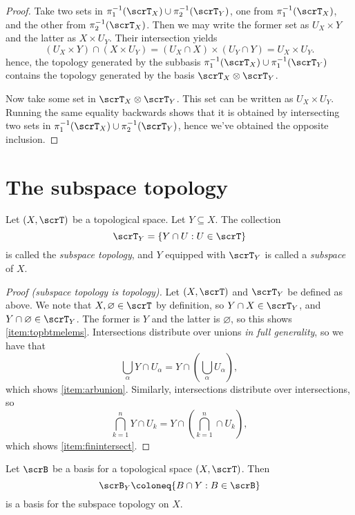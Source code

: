 \documentclass{article}
\begin{document}
\begin{proof}
    Take two sets in $\pi_1^{-1}(\scrT_X) \cup \pi_2^{-1}(\scrT_Y)$, one from $\pi_1^{-1}(\scrT_X)$, and the other from $\pi_2^{-1}(\scrT_X)$.
    Then we may write the former set as $U_X \times Y$ and the latter as $X \times U_Y$.
    Their intersection yields
    \[
        (U_X \times Y) \cap (X \times U_Y) = (U_X \cap X) \times (U_Y \cap Y) = U_X \times U_Y.
    \]
    hence, the topology generated by the subbasis $\pi_1^{-1}(\scrT_X) \cup \pi_1^{-1}(\scrT_Y)$ contains the topology generated by the basis $\scrT_X \otimes \scrT_Y$.

    Now take some set in $\scrT_X \otimes \scrT_Y$.
    This set can be written as $U_X \times U_Y$.
    Running the same equality backwards shows that it is obtained by intersecting two sets in $\pi_1^{-1}(\scrT_X) \cup \pi_2^{-1}(\scrT_Y)$, hence we've obtained the opposite inclusion.
\end{proof}

\section{The subspace topology}

\begin{definition}
    Let $(X, \scrT)$ be a topological space.
    Let $Y \subseteq X$.
    The collection
    \[
        \scrT_Y = \{Y \cap U : U \in \scrT\}
    \]
    is called the \textit{subspace topology}, and $Y$ equipped with $\scrT_Y$ is called a \textit{subspace} of $X$.
\end{definition}

\begin{proof}[Proof (subspace topology is topology)]
    Let $(X, \scrT)$ and $\scrT_Y$ be defined as above.
    We note that $X, \varnothing \in \scrT$ by definition, so
    $Y \cap X \in \scrT_Y$, and $Y \cap \varnothing \in \scrT_Y$.
    The former is $Y$ and the latter is $\varnothing$, so this shows \ref{item:topbtmelems}.
    Intersections distribute over unions \textit{in full generality}, so we have that
    \[
        \bigcup_\alpha Y \cap U_\alpha = Y \cap \left(\bigcup_\alpha U_\alpha\right),
    \]
    which shows \ref{item:arbunion}.
    Similarly, intersections distribute over intersections, so
    \[
        \bigcap_{k=1}^n Y \cap U_k = Y \cap \left(\bigcap_{k=1}^n \cap U_k \right),
    \]
    which shows \ref{item:finintersect}.
\end{proof}

\begin{lemma}
    Let $\scrB$ be a basis for a topological space $(X, \scrT)$.
    Then
    \[
        \scrB_Y \coloneq \{B \cap Y : B \in \scrB\}
    \]
    is a basis for the subspace topology on $X$.
\end{lemma}
\end{document}
